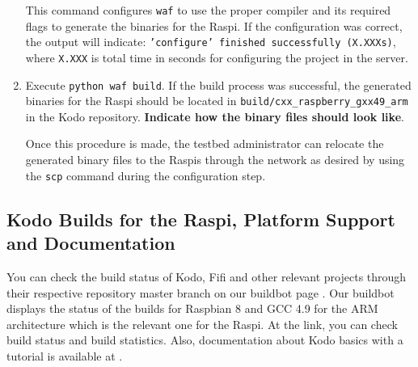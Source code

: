 \begin{enumerate}
This command configures \texttt{waf} to use the proper compiler and its
required flags to generate the binaries for the \ac{Raspi}. If the
configuration was correct, the output will indicate:
\texttt{'configure' finished successfully (X.XXXs)}, where \texttt{X.XXX}
is total time in seconds for configuring the project in the server. \\

\item Execute \texttt{python waf build}. If the build process was
successful, the generated binaries for the \ac{Raspi} should be located
in \texttt{build/cxx\_raspberry\_gxx49\_arm} in the Kodo repository.
\textbf{Indicate how the binary files should look like}.

Once this procedure is made, the testbed administrator can relocate the
generated binary files to the \ac{Raspi}s through the network as desired
by using the \texttt{scp} command during the configuration step.


\end{enumerate}

\subsection{Kodo Builds for the \ac{Raspi}, Platform Support and Documentation}

You can check the build status of Kodo, Fifi and other relevant projects
through their respective repository master branch on our buildbot page
\cite{steinwurf2016buildbot}. Our buildbot displays the status of the builds
for Raspbian 8 and GCC 4.9 for the ARM architecture which is the relevant one
for the \ac{Raspi}. At the link, you can check build status and build
statistics. Also, documentation about Kodo basics with a tutorial is available
at \cite{kododocs}.
